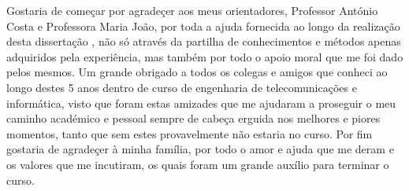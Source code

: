 
%

\begin{ntacknowledgements}

Gostaria de começar por agradeçer aos meus orientadores, Professor António Costa e Professora Maria João, por toda a ajuda fornecida ao longo da realização desta dissertação
, não só através da partilha de conhecimentos e métodos apenas adquiridos pela experiência, mas também por todo o apoio moral que me foi dado pelos mesmos.
Um grande obrigado a todos os colegas e amigos que conheci ao longo destes 5 anos dentro de curso de engenharia de telecomunicações e informática, 
visto que foram estas amizades que me ajudaram a proseguir o meu caminho académico e pessoal sempre de cabeça erguida nos melhores e piores momentos, tanto que sem
estes provavelmente não estaria no curso.
Por fim gostaria de agradeçer à minha família, por todo o amor e ajuda que me deram e os valores que me incutiram, os quais foram um grande auxílio para terminar o curso.

\end{ntacknowledgements}